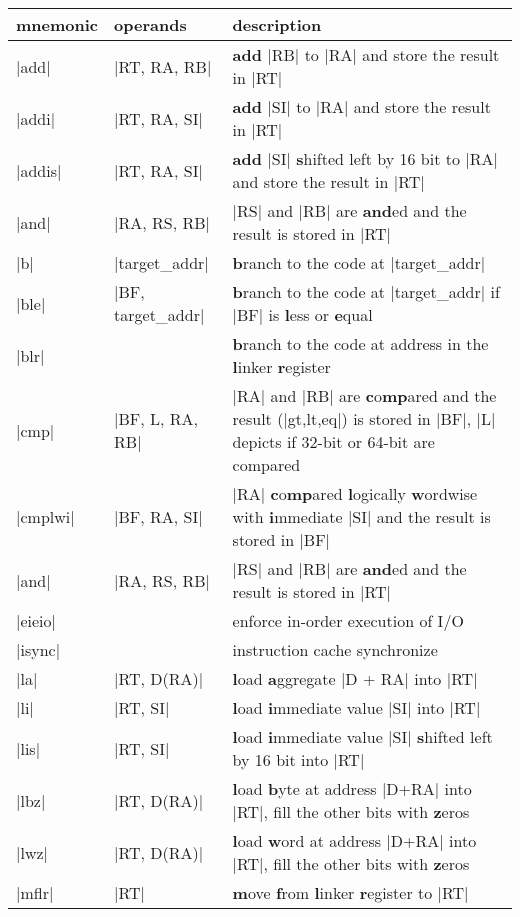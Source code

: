 \begin{tabular}{l l p{9cm}}
    mnemonic & operands & description \\
    \hline
    |add| & |RT, RA, RB| & \textbf{add} |RB| to |RA| and store the result in |RT| \\
    |addi| & |RT, RA, SI| & \textbf{add} |SI| to |RA| and store the result in |RT| \\
    |addis| & |RT, RA, SI| & \textbf{add} |SI| \textbf{s}hifted left by 16 bit to |RA| and store the result in |RT| \\
    |and| & |RA, RS, RB| & |RS| and |RB| are \textbf{and}ed and the result is stored in |RT| \\
    |b| & |target_addr| & \textbf{b}ranch to the code at |target_addr|\\
    |ble| & |BF, target_addr| & \textbf{b}ranch to the code at |target_addr| if |BF| is \textbf{l}ess or \textbf{e}qual \\
    |blr| & & \textbf{b}ranch to the code at address in the \textbf{l}inker \textbf{r}egister \\
    |cmp| & |BF, L, RA, RB| & |RA| and |RB| are \textbf{c}o\textbf{mp}ared and the result (|gt,lt,eq|) is stored in |BF|, |L| depicts if 32-bit or 64-bit are compared \\
    |cmplwi| & |BF, RA, SI| & |RA| \textbf{c}o\textbf{mp}ared \textbf{l}ogically \textbf{w}ordwise with \textbf{i}mmediate |SI| and the result is stored in |BF|\\
    |and| & |RA, RS, RB| & |RS| and |RB| are \textbf{and}ed and the result is stored in |RT| \\
    |eieio| & & enforce in-order execution of I/O\\
    |isync| & & instruction cache synchronize\\
    |la| & |RT, D(RA)| & \textbf{l}oad \textbf{a}ggregate |D + RA| into |RT|\\
    |li| & |RT, SI| & \textbf{l}oad \textbf{i}mmediate value |SI| into |RT|\\
    |lis| & |RT, SI| & \textbf{l}oad \textbf{i}mmediate value |SI| \textbf{s}hifted left by 16 bit into |RT|\\
    |lbz| & |RT, D(RA)| & \textbf{l}oad \textbf{b}yte at address |D+RA| into |RT|, fill the other bits with \textbf{z}eros \\
    |lwz| & |RT, D(RA)| & \textbf{l}oad \textbf{w}ord at address |D+RA| into |RT|, fill the other bits with \textbf{z}eros \\
    |mflr| & |RT| & \textbf{m}ove \textbf{f}rom \textbf{l}inker \textbf{r}egister to |RT|\\

\end{tabular}
